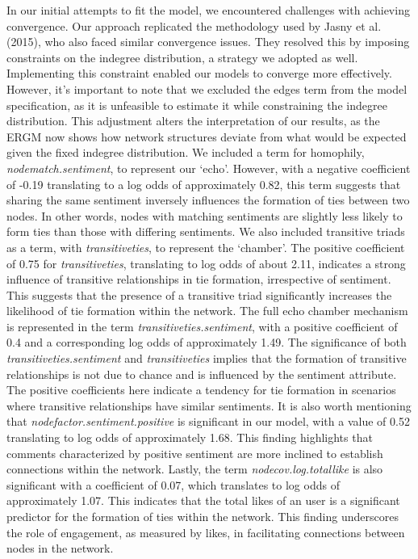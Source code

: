 \documentclass[
  man,floatsintext]{apa6}
\begin{document}
In our initial attempts to fit the model, we encountered challenges with achieving convergence. Our approach replicated the methodology used by Jasny et al. (2015), who also faced similar convergence issues. They resolved this by imposing constraints on the indegree distribution, a strategy we adopted as well. Implementing this constraint enabled our models to converge more effectively. However, it's important to note that we excluded the edges term from the model specification, as it is unfeasible to estimate it while constraining the indegree distribution. This adjustment alters the interpretation of our results, as the ERGM now shows how network structures deviate from what would be expected given the fixed indegree distribution.
We included a term for homophily, \textit{nodematch.sentiment}, to represent our `echo'. However, with a negative coefficient of -0.19 translating to a log odds of approximately 0.82, this term suggests that sharing the same sentiment inversely influences the formation of ties between two nodes. In other words, nodes with matching sentiments are slightly less likely to form ties than those with differing sentiments.
We also included transitive triads as a term, with \textit{transitiveties}, to represent the `chamber'. The positive coefficient of 0.75 for \textit{transitiveties}, translating to log odds of about 2.11, indicates a strong influence of transitive relationships in tie formation, irrespective of sentiment. This suggests that the presence of a transitive triad significantly increases the likelihood of tie formation within the network.
The full echo chamber mechanism is represented in the term \textit{transitiveties.sentiment}, with a positive coefficient of 0.4 and a corresponding log odds of approximately 1.49. The significance of both \textit{transitiveties.sentiment} and \textit{transitiveties} implies that the formation of transitive relationships is not due to chance and is influenced by the sentiment attribute. The positive coefficients here indicate a tendency for tie formation in scenarios where transitive relationships have similar sentiments.
It is also worth mentioning that \textit{nodefactor.sentiment.positive} is significant in our model, with a value of 0.52 translating to log odds of approximately 1.68. This finding highlights that comments characterized by positive sentiment are more inclined to establish connections within the network.
Lastly, the term \textit{nodecov.log.total\textunderscore like} is also significant with a coefficient of 0.07, which translates to log odds of approximately 1.07. This indicates that the total likes of an user is a significant predictor for the formation of ties within the network. This finding underscores the role of engagement, as measured by likes, in facilitating connections between nodes in the network. \newpage
\end{document}
